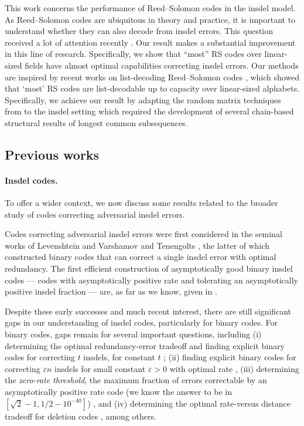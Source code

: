 \documentclass[11pt]{article}
\theoremstyle{plain}
\theoremstyle{definition}
\theoremstyle{remark}
\begin{document}
    This work concerns the performance of Reed--Solomon codes in the insdel model. As Reed--Solomon codes are ubiquitous in theory and practice, 
    it is important to understand whether they can also decode from insdel errors. This question received a lot of attention recently \cite{safavi2002traitor,wang2004deletion,tonien2007construction,duc2019explicit,liu20212,chen2021improved,con2023reed,con2023optimal,liu2024optimal}. 
    Our result makes a substantial improvement in this line of research. Specifically, we show that ``most'' RS codes over linear-sized fields have almost optimal capabilities correcting insdel errors. 
Our methods are inspired by recent works on list-decoding Reed--Solomon codes \cite{GZ23,alrabiah2023randomly}, which showed that `most' RS codes are list-decodable up to capacity over linear-sized alphabets. Specifically, we achieve our result by 
    adapting the random matrix techniques from \cite{GZ23,alrabiah2023randomly} to the insdel setting which required the development of several chain-based structural results of longest common subsequences.

    \subsection{Previous works}
    \paragraph{Insdel codes.} To offer a wider context, we now discuss some results related to the broader study of codes correcting adversarial insdel errors. 

    Codes correcting adversarial insdel errors were first considered in the seminal works of Levenshtein \cite{levenshtein1966binary} and Varshamov and Tenengolts \cite{varshamov1965codes}, the latter of which constructed binary codes that can correct a single insdel error with optimal redundancy. 
    The first efficient construction of asymptotically good binary insdel codes --- codes with asymptotically positive rate and tolerating an asymptotically positive insdel fraction --- are, as far as we know, given in \cite{schulman1999asymptotically}. 

    Despite these early successes and much recent interest, there are still significant gaps in our understanding of insdel codes, particularly for binary codes.
    For binary codes, gaps remain for several important questions, including (i) determining the optimal redundancy-error tradeoff and finding explicit binary codes for correcting $t$ insdels, for constant $t$ \cite{guruswami2021explicit,sima2020optimal,sima2020systematic}; (ii) finding explicit binary codes for correcting $\varepsilon n$ insdels for small constant $\varepsilon>0$ with optimal rate \cite{cheng2018deterministic,haeupler2019optimal}, (iii) determining the \emph{zero-rate threshold}, the maximum fraction of errors correctable by an asymptotically positive rate code (we know the answer to be in $[\sqrt{2}-1,1/2-10^{-40}]$) \cite{guruswami2016efficiently, guruswami2022zero}, and (iv) determining the optimal rate-versus distance tradeoff for deletion codes \cite{levenshtein1966binary,levenshtein2002bounds,yasunaga2024improved}, among others. 
    
\end{document}
